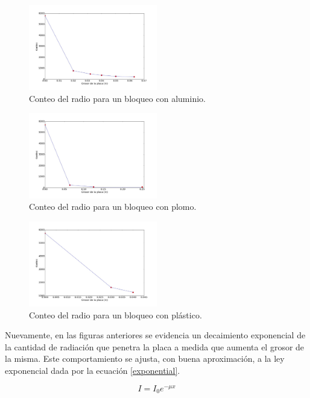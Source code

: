 \documentclass[prb,aps,twocolumn,preprintnumbers,amsmath,amssymb]{revtex4}
\begin{document}
\begin{figure}[h!]
	\centering
	\includegraphics[width=0.5\textwidth]{bloqueo1}
	\caption{Conteo del radio para un bloqueo con aluminio.}
	\label{fig: bloqueo1}
\end{figure}


\begin{figure}[h!]
	\centering
	\includegraphics[width=0.5\textwidth]{bloqueo2}
	\caption{Conteo del radio para un bloqueo con plomo.}
	\label{fig: bloqueo2}
\end{figure}

\begin{figure}[h!]
	\centering
	\includegraphics[width=0.5\textwidth]{bloqueo3}
	\caption{Conteo del radio para un bloqueo con plástico.}
	\label{fig: bloqueo3}
\end{figure}

Nuevamente, en las figuras anteriores se evidencia un decaimiento exponencial de la cantidad de radiación que penetra la placa a medida que aumenta el grosor de la misma. Este comportamiento se ajusta, con buena aproximación, a la ley exponencial dada por la ecuación \eqref{exponential}.

\begin{equation}
\label{exponential}
I = I_{0}e^{-\mu x}
\end{equation}
\end{document}
